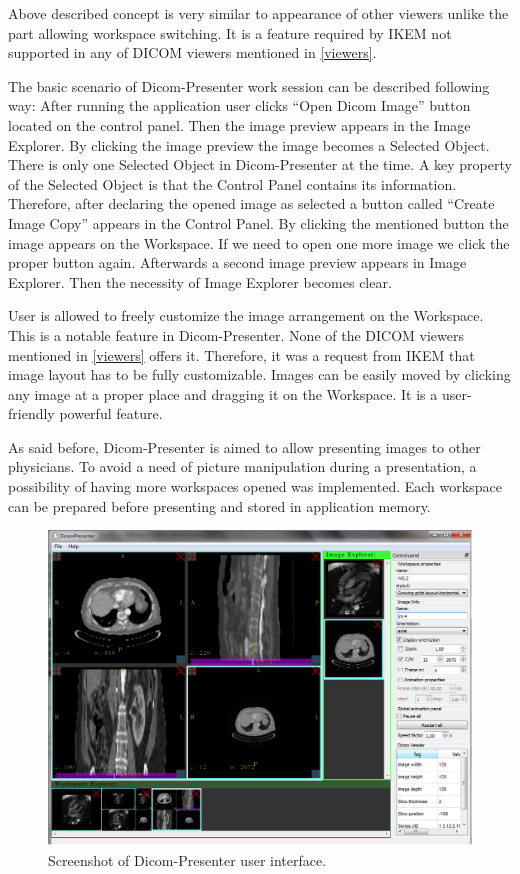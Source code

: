 Above described concept is very similar to appearance of other viewers unlike the part allowing workspace switching. It is a feature required by IKEM not supported in any of DICOM viewers mentioned in \ref{viewers}.

The basic scenario of Dicom-Presenter work session can be described following way: After running the application user clicks ``Open Dicom Image'' button located on the control panel. Then the image preview appears in the Image Explorer. By clicking the image preview the image becomes a Selected Object. There is only one Selected Object in Dicom-Presenter at the time. A key property of the Selected Object is that the Control Panel contains its information. Therefore, after declaring the opened image as selected a button called ``Create Image Copy'' appears in the Control Panel. By clicking the mentioned button the image appears on the Workspace. If we need to open one more image we click the proper button again. Afterwards a second image preview appears in Image Explorer. Then the necessity of Image Explorer becomes clear.

User is allowed to freely customize the image arrangement on the Workspace. This is a notable feature in Dicom-Presenter. None of the DICOM viewers mentioned in \ref{viewers} offers it. Therefore, it was a request from IKEM that image layout has to be fully customizable. Images can be easily moved  by clicking any image at a proper place and dragging it on the Workspace.  It is a user-friendly powerful feature.

As said before, Dicom-Presenter is aimed to allow presenting images to other physicians. To avoid a need of picture manipulation during a presentation, a possibility of having more workspaces opened was implemented. Each workspace can be prepared before presenting and stored in application memory.
 
\begin{figure}
	\begin{center}
	\includegraphics[width=130mm]{Text/IMG/04_GUI_Screenshot.png}
	\end{center}
	\caption{Screenshot of Dicom-Presenter user interface.}
	\label{screenshot}
\end{figure}